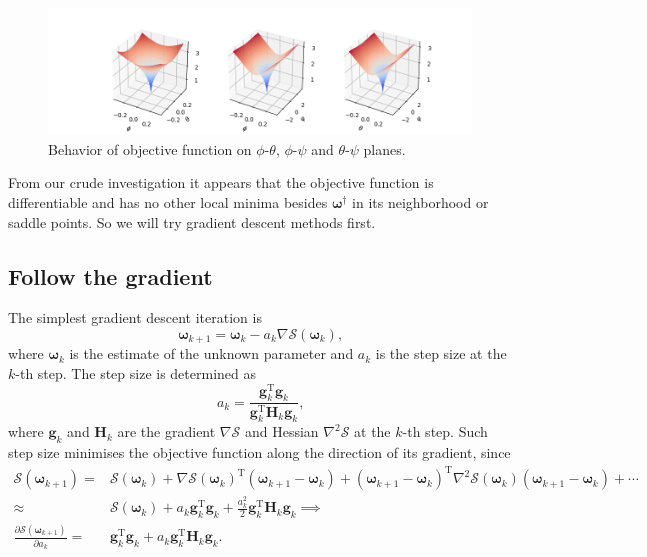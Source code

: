 \documentclass{article}
\renewcommand{\vec}[1]{\mathbf{#1}}
\newcommand{\bomega}{\boldsymbol{\omega}}
\begin{document}
\begin{figure}[h]
  \centering
  \includegraphics[width=\linewidth]{figures/gradient-angles.png}
  \caption{Behavior of objective function on $\phi$-$\theta$, $\phi$-$\psi$ and $\theta$-$\psi$ planes.}
  \label{fig:gradient-angles}
\end{figure}

From our crude investigation it appears that the objective function is differentiable and has no other local minima besides $\bomega^\dagger$
in its neighborhood or saddle points.
So we will try gradient descent methods first.

\subsection{Follow the gradient}
The simplest gradient descent iteration is
\begin{equation}
  \bomega_{k+1} = \bomega_{k} - a_k \nabla \mathcal{S}\left(\bomega_{k}\right)\text{,}
\end{equation}
where $\bomega_k$ is the estimate of the unknown parameter and $a_k$ is the step size at the $k$-th step.
The step size is determined as
\begin{equation}
  a_k = \frac{\vec{g}_k^\mathrm{T} \vec{g}_k}{\vec{g}_k^\mathrm{T} \vec{H}_k \vec{g}_k}\text{,}
\end{equation}
where $\vec{g}_k$ and $\vec{H}_k$ are the gradient $\nabla\mathcal{S}$ and Hessian $\nabla^2\mathcal{S}$ at the $k$-th step.
Such step size minimises the objective function along the direction of its gradient, since
\begin{equation*}
  \begin{split}
    \mathcal{S}\left(\bomega_{k+1}\right) = & \mathcal{S}\left(\bomega_k\right) + \nabla\mathcal{S}\left(\bomega_k\right)^\mathrm{T} \left(\bomega_{k+1}-\bomega_k\right) + \left(\bomega_{k+1}-\bomega_k\right)^\mathrm{T} \nabla^2\mathcal{S}\left(\bomega_k\right) \left(\bomega_{k+1}-\bomega_k\right) + \cdots \\
    \approx & \mathcal{S}\left(\bomega_k\right) + a_k \vec{g}_k^\mathrm{T} \vec{g}_k + \frac{a_k^2}{2}\vec{g}_k^\mathrm{T} \vec{H}_k \vec{g}_k \implies \\
    \frac{\partial \mathcal{S}\left(\bomega_{k+1}\right)}{\partial a_k} = & \vec{g}_k^\mathrm{T}\vec{g}_k + a_k \vec{g}_k^\mathrm{T} \vec{H}_k \vec{g}_k \text{.}
  \end{split}
\end{equation*}
\end{document}
